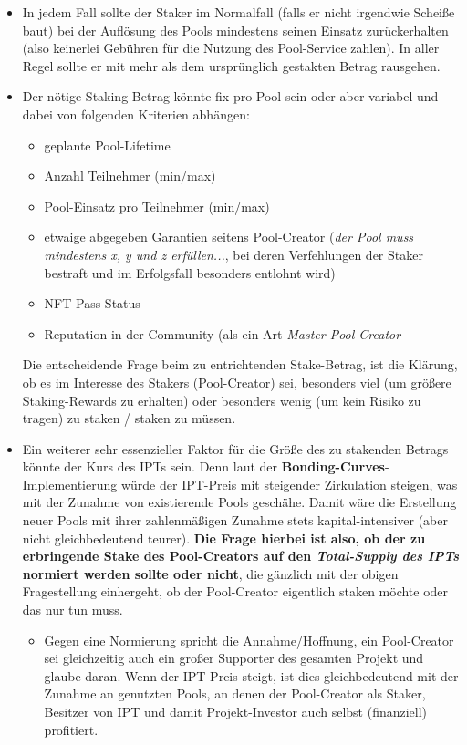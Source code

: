 \begin{itemize}
	\item In jedem Fall sollte der Staker im Normalfall (falls er nicht irgendwie Scheiße baut) bei der Auflösung des Pools mindestens seinen Einsatz zurückerhalten (also keinerlei Gebühren für die Nutzung des Pool-Service zahlen). In aller Regel sollte er mit mehr als dem ursprünglich gestakten Betrag rausgehen.
	\item Der nötige Staking-Betrag könnte fix pro Pool sein oder aber variabel und dabei von folgenden Kriterien abhängen:
	\begin{itemize}
		\item geplante Pool-Lifetime
		\item Anzahl Teilnehmer (min/max)
		\item Pool-Einsatz pro Teilnehmer (min/max)
		\item etwaige abgegeben Garantien seitens Pool-Creator (\textit{der Pool muss mindestens x, y und z erfüllen...}, bei deren Verfehlungen der Staker bestraft und im Erfolgsfall besonders entlohnt wird)
		\item NFT-Pass-Status
		\item Reputation in der Community (als ein Art \textit{Master Pool-Creator}
	\end{itemize}
	Die entscheidende Frage beim zu entrichtenden Stake-Betrag, ist die Klärung, ob es im Interesse des Stakers (Pool-Creator) sei, besonders viel (um größere Staking-Rewards zu erhalten) oder besonders wenig (um kein Risiko zu tragen) zu staken / staken zu müssen.
	\item Ein weiterer sehr essenzieller Faktor für die Größe des zu stakenden Betrags könnte der Kurs des IPTs sein. Denn laut der \textbf{Bonding-Curves}-Implementierung würde der IPT-Preis mit steigender Zirkulation steigen, was mit der Zunahme von existierende Pools geschähe. Damit wäre die Erstellung neuer Pools mit ihrer zahlen\-mäßigen Zunahme stets kapital-intensiver (aber nicht gleichbedeutend teurer). \textbf{Die Frage hierbei ist also, ob der zu erbringende Stake des Pool-Creators auf den \textit{Total-Supply des IPTs} normiert werden sollte oder nicht}, die gänzlich mit der obigen Fragestellung einhergeht, ob der Pool-Creator eigentlich staken möchte oder das nur tun muss.
	\begin{itemize}
		\item Gegen eine Normierung spricht die Annahme/Hoffnung, ein Pool-Creator sei gleichzeitig auch ein großer Supporter des gesamten Projekt und glaube daran. Wenn der IPT-Preis steigt, ist dies gleichbedeutend mit der Zunahme an genutzten Pools, an denen der Pool-Creator als Staker, Besitzer von IPT und damit Projekt-Investor auch selbst (finanziell) profitiert.

\end{itemize}
\end{itemize}
